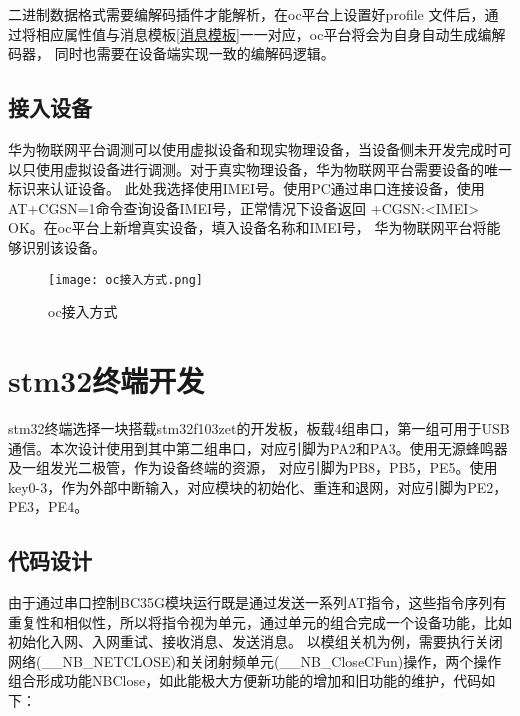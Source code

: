 二进制数据格式需要编解码插件才能解析，在oc平台上设置好profile 文件后，通过将相应属性值与消息模板\ref{消息模板}一一对应，oc平台将会为自身自动生成编解码器，
同时也需要在设备端实现一致的编解码逻辑。


\subsection{接入设备}
华为物联网平台调测可以使用虚拟设备和现实物理设备，当设备侧未开发完成时可以只使用虚拟设备进行调测。对于真实物理设备，华为物联网平台需要设备的唯一标识来认证设备。
此处我选择使用IMEI号。使用PC通过串口连接设备，使用AT+CGSN=1命令查询设备IMEI号，正常情况下设备返回 +CGSN:<IMEI> OK。在oc平台上新增真实设备，填入设备名称和IMEI号，
华为物联网平台将能够识别该设备。
\begin{figure}[h]
	\texttt{[image: oc接入方式.png]}
	\caption{oc接入方式}
	\label{oc接入方式}
\end{figure}


\section{stm32终端开发}
stm32终端选择一块搭载stm32f103zet的开发板，板载4组串口，第一组可用于USB通信。本次设计使用到其中第二组串口，对应引脚为PA2和PA3。使用无源蜂鸣器及一组发光二极管，作为设备终端的资源，
对应引脚为PB8，PB5，PE5。使用key0-3，作为外部中断输入，对应模块的初始化、重连和退网，对应引脚为PE2，PE3，PE4。


\subsection{代码设计}
由于通过串口控制BC35G模块运行既是通过发送一系列AT指令，这些指令序列有重复性和相似性，所以将指令视为单元，通过单元的组合完成一个设备功能，比如初始化入网、入网重试、接收消息、发送消息。
以模组关机为例，需要执行关闭网络(\_\_NB\_NETCLOSE)和关闭射频单元(\_\_NB\_CloseCFun)操作，两个操作组合形成功能NBClose，如此能极大方便新功能的增加和旧功能的维护，代码如下：

